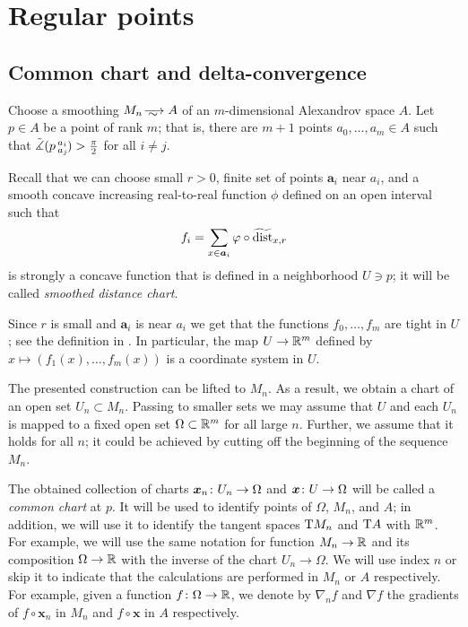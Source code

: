 \section{Regular points}\label{sec:ref}

\subsection{Common chart and delta-convergence}\label{subsec:chart+delta}

Choose a smoothing $M_n\smooths{} A$ of an $m$-dimensional Alexandrov space $A$.
Let $p\in A$ be a point of rank $m$; that is, there are $m+1$ points $a_0,\dots, a_m\in A$ such that 
$\tilde\measuredangle(p\,{}^{a_i}_{a_j}\hspace{-0.2ex})>\tfrac\pi2$ for all $i\ne j$.

Recall \cite[Sec. 7]{petrunin-conc} that we can choose small $r>0$,
finite set of points $\bm{a}_i$ near $a_i$,
and a smooth concave increasing real-to-real function $\phi$ defined on an open interval such that 
\[f_i=\sum_{x\in \bm{a}_i}\varphi\circ\widetilde{\operatorname{\rm dist}}_{x,r}\]
is strongly a concave function that is defined in a neighborhood $U\ni p$;
it will be called \emph{smoothed distance chart}.

Since $r$ is small and $\bm{a}_i$ is near $a_i$ we get that the functions $f_0, \dots, f_m$ are tight in $U$; see the definition in \cite{petrunin-conc}.
In particular, the map $U\to\mathbb{R}^m$ defined by $x\mapsto (f_1(x),\dots,f_m(x))$ is a coordinate system in $U$.

The presented construction can be lifted to $M_n$.
As a result, we obtain a chart of an open set $U_n\subset M_n$.
Passing to smaller sets we may assume that $U$ and each $U_n$ is mapped to a fixed open set $\Omega\subset\mathbb{R}^m$ for all large $n$.
Further, we assume that it holds for all $n$; it could be achieved by cutting off the beginning of the sequence $M_n$.

The obtained collection of charts $\bm{x}_n\:U_n\zz\to \Omega$ and $\bm{x}\:U\zz\to \Omega$ will be called a \emph{common chart} at $p$.
It will be used to identify points of $\Omega$, $M_n$, and $A$; 
in addition, we will use it to identify the tangent spaces $\mathrm{T} M_n$ and $\mathrm{T} A$ with $\mathbb{R}^m$.
For example, we will use the same notation for function $M_n\to \mathbb{R}$ and its composition $\Omega\to \mathbb{R}$ with the inverse of the chart $U_n\to \Omega$.
We will use index $n$ or skip it to indicate that the calculations are performed in $M_n$ or $A$ respectively.
For example, given a function $f\colon\Omega\to \mathbb{R}$, we denote by $\nabla_nf$ and $\nabla f$ the gradients of $f\circ \bm{x}_n$ in $M_n$ and $f\circ \bm{x}$ in $A$ respectively.

